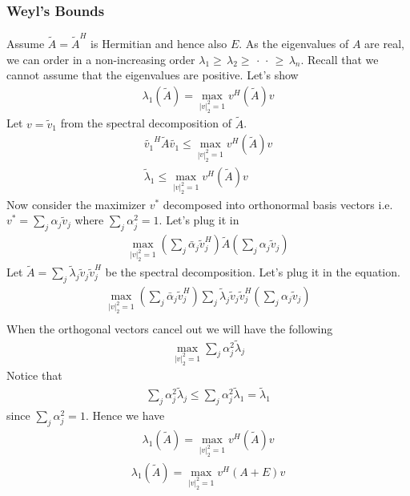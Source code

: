 \documentclass[a4paper, english, headtopline=0.08em, headsepline=0.04em, left = 1cm, right = 1cm, DIV=15]{article}
\begin{document}
\subsubsection*{Weyl's Bounds}
Assume $\tilde A = {\tilde A}^H$ is Hermitian and hence also $E$.
As the eigenvalues of $A$ are real, we can order in a
non-increasing order $\lambda_{1}\geq\,\lambda_{2}\geq\,\cdot\,\cdot\,\geq\,\lambda_{n}$.
Recall that we cannot assume that the eigenvalues are positive.
Let's show
\begin{align*}
	\lambda_1(\tilde A) = \max_{|v|^2_{2}=1}v^{H}(\tilde A)v 
\end{align*}
Let $v=\tilde v_1$ from the spectral decomposition of $\tilde A$.
\begin{align*}
	 \tilde {v_1}^H \tilde A \tilde {v_1}  \leq \max_{|v|^2_{2}=1}v^{H}(\tilde A)v \\
	 \tilde \lambda_1  \leq \max_{|v|^2_{2}=1}v^{H}(\tilde A)v 
\end{align*}
Now consider the maximizer $v^*$ decomposed into orthonormal basis vectors i.e. $v^* = \sum_j\alpha_j\tilde v_j$ where $\sum_j \alpha_j^2 = 1$.
Let's plug it in
\begin{align*}
	\max_{|v|^2_{2}=1} \left(\sum_j{\bar\alpha_j}\tilde v_j^H\right)\tilde A\left(\sum_j\alpha_j\tilde v_j\right)
\end{align*}
Let $\tilde A = \sum_j \tilde \lambda_j \tilde v_j \tilde v_j^H$ be the spectral decomposition. Let's plug it in the equation.
\begin{align*}
	\max_{|v|^2_{2}=1} \left(\sum_j{\bar\alpha_j}\tilde v_j^H\right) \sum_j \tilde \lambda_j \tilde v_j \tilde v_j^H\left(\sum_j\alpha_j\tilde v_j\right) \\
\end{align*}
When the orthogonal vectors cancel out we will have the following
\begin{align*}
	\max_{|v|^2_{2}=1} \sum_j \alpha_j^2\tilde\lambda_j
\end{align*}
Notice that 
\begin{align*}
\sum_j \alpha_j^2 \tilde \lambda_j \leq \sum_j  \alpha_j^2 \tilde \lambda_1 = \tilde \lambda_1
\end{align*}
since $\sum_j \alpha_j^2 = 1$. Hence we have
\begin{align*}
	\lambda_1(\tilde A) = \max_{|v|^2_{2}=1}v^{H}(\tilde A)v 
\end{align*}
\begin{align*}
	\lambda_1(\tilde A) = \max_{|v|^2_{2}=1}v^{H}(A+E)v \\
\end{align*}
\end{document}
